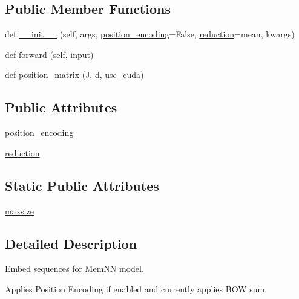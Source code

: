 \subsection*{Public Member Functions}
\begin{DoxyCompactItemize}
\item 
def \hyperlink{classparlai_1_1agents_1_1memnn_1_1modules_1_1Embed_a3d901aa67e52a3ea160b5f41acecd2c6}{\+\_\+\+\_\+init\+\_\+\+\_\+} (self, args, \hyperlink{classparlai_1_1agents_1_1memnn_1_1modules_1_1Embed_af0373995dcb0351175527b06b1db8874}{position\+\_\+encoding}=False, \hyperlink{classparlai_1_1agents_1_1memnn_1_1modules_1_1Embed_a93010185a49bafacc478d85856d1c95d}{reduction}=\textquotesingle{}mean\textquotesingle{}, kwargs)
\item 
def \hyperlink{classparlai_1_1agents_1_1memnn_1_1modules_1_1Embed_a03a7701e101296fbbf28dcc05039c248}{forward} (self, input)
\item 
def \hyperlink{classparlai_1_1agents_1_1memnn_1_1modules_1_1Embed_aa6a44a42ac7d06f0f0598b7291d1dc58}{position\+\_\+matrix} (J, d, use\+\_\+cuda)
\end{DoxyCompactItemize}
\subsection*{Public Attributes}
\begin{DoxyCompactItemize}
\item 
\hyperlink{classparlai_1_1agents_1_1memnn_1_1modules_1_1Embed_af0373995dcb0351175527b06b1db8874}{position\+\_\+encoding}
\item 
\hyperlink{classparlai_1_1agents_1_1memnn_1_1modules_1_1Embed_a93010185a49bafacc478d85856d1c95d}{reduction}
\end{DoxyCompactItemize}
\subsection*{Static Public Attributes}
\begin{DoxyCompactItemize}
\item 
\hyperlink{classparlai_1_1agents_1_1memnn_1_1modules_1_1Embed_aa77cd4b6d146e1981b96b911e6eb62c1}{maxsize}
\end{DoxyCompactItemize}


\subsection{Detailed Description}
\begin{DoxyVerb}Embed sequences for MemNN model.

Applies Position Encoding if enabled and currently applies BOW sum.
\end{DoxyVerb}
 

